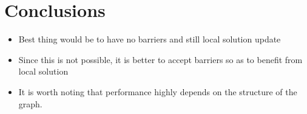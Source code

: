 \documentclass[letterpaper]{article}
\begin{document}
\section{Conclusions}

\begin{invisible}
 \begin{itemize}
   \item Best thing would be to have no barriers and still local solution update
   \item Since this is not possible, it is better to accept barriers so as to benefit from local solution
   \item It is worth noting that performance highly depends on the structure of the graph.
 \end{itemize}
\end{invisible}



\end{document}
